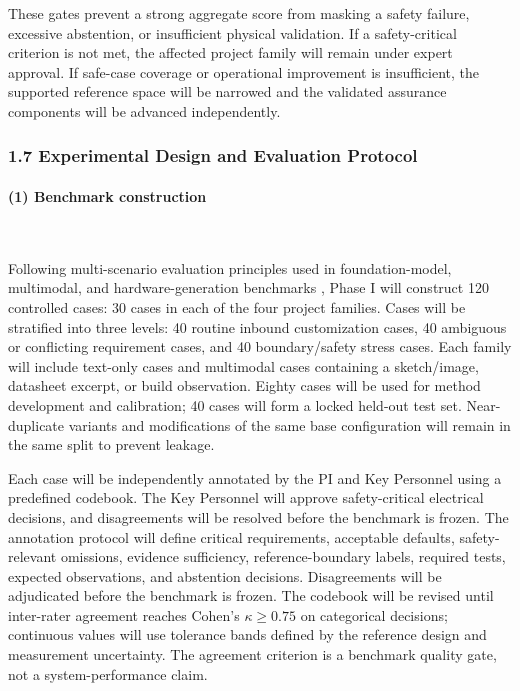 \documentclass[11pt,letterpaper]{article}
\begin{document}
These gates prevent a strong aggregate score from masking a safety failure, excessive abstention, or insufficient physical validation. If a safety-critical criterion is not met, the affected project family will remain under expert approval. If safe-case coverage or operational improvement is insufficient, the supported reference space will be narrowed and the validated assurance components will be advanced independently.


\subsubsection*{1.7 Experimental Design and Evaluation Protocol}
\paragraph{(1) Benchmark construction}~{}

Following multi-scenario evaluation principles used in foundation-model, multimodal, and hardware-generation benchmarks \cite{liang2023helm,yue2024mmmu,liu2023verilogeval}, Phase I will construct 120 controlled cases: 30 cases in each of the four project families. Cases will be stratified into three levels: 40 routine inbound customization cases, 40 ambiguous or conflicting requirement cases, and 40 boundary/safety stress cases. Each family will include text-only cases and multimodal cases containing a sketch/image, datasheet excerpt, or build observation. Eighty cases will be used for method development and calibration; 40 cases will form a locked held-out test set. Near-duplicate variants and modifications of the same base configuration will remain in the same split to prevent leakage.

Each case will be independently annotated by the PI and Key Personnel using a predefined codebook. The Key Personnel will approve safety-critical electrical decisions, and disagreements will be resolved before the benchmark is frozen.
The annotation protocol will define critical requirements, acceptable defaults, safety-relevant omissions, evidence sufficiency, reference-boundary labels, required tests, expected observations, and abstention decisions. Disagreements will be adjudicated before the benchmark is frozen. The codebook will be revised until inter-rater agreement reaches Cohen's $\kappa\geq0.75$ on categorical decisions; continuous values will use tolerance bands defined by the reference design and measurement uncertainty. The agreement criterion is a benchmark quality gate, not a system-performance claim.
\end{document}

